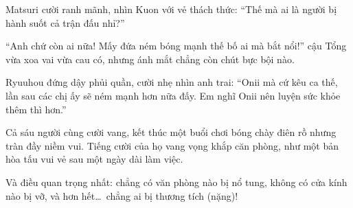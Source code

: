 \documentclass[../main.tex]{subfiles}
\begin{document}
Matsuri cười ranh mãnh, nhìn Kuon với vẻ thách thức: ``Thế mà ai là người bị hành suốt cả trận đấu nhỉ?''

``Anh chứ còn ai nữa! Mấy đứa ném bóng mạnh thế bố ai mà bắt nổi!'' cậu Tổng vừa xoa vai vừa cau có, nhưng ánh mắt chẳng còn chút bực bội nào.

Ryuuhou đứng dậy phủi quần, cười nhẹ nhìn anh trai: ``Onii mà cứ kêu ca thế, lần sau các chị ấy sẽ ném mạnh hơn nữa đấy. Em nghĩ Onii nên luyện sức khỏe thêm thì hơn.''

Cả sáu người cùng cười vang, kết thúc một buổi chơi bóng chày điên rồ nhưng tràn đầy niềm vui. Tiếng cười của họ vang vọng khắp căn phòng, như một bản hòa tấu vui vẻ sau một ngày dài làm việc.

Và điều quan trọng nhất: chẳng có văn phòng nào bị nổ tung, không có cửa kính nào bị vỡ, và hơn hết\dots\ chẳng ai bị thương tích (nặng)!
\end{document}
